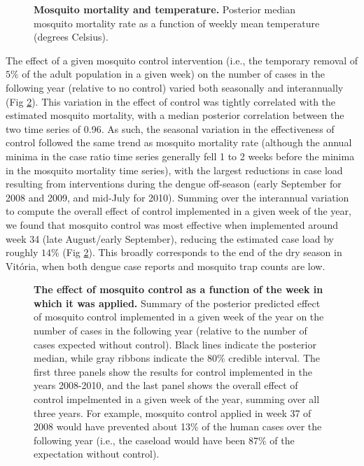\documentclass[10pt,letterpaper]{article}
\begin{document}
\begin{figure}[!h]
\caption{{\bf Mosquito mortality and temperature.}
Posterior median mosquito mortality rate as a function of weekly mean temperature (degrees Celsius).
}
\label{mortality}
\end{figure}

The effect of a given mosquito control intervention (i.e., the temporary removal of $5\%$ of the adult population in a given week) on the number of cases in the following year (relative to no control) varied both seasonally and interannually (Fig \ref{control}).
This variation in the effect of control was tightly correlated with the estimated mosquito mortality, with a median posterior correlation between the two time series of 0.96.
As such, the seasonal variation in the effectiveness of control followed the same trend as mosquito mortality rate (although the annual minima in the case ratio time series generally fell 1 to 2 weeks before the minima in the mosquito mortality time series), with the largest reductions in case load resulting from interventions during the dengue off-season (early September for 2008 and 2009, and mid-July for 2010).
Summing over the interannual variation to compute the overall effect of control implemented in a given week of the year, we found that mosquito control was most effective when implemented around  week 34 (late August/early September), reducing the estimated case load by roughly $14\%$ (Fig \ref{control}).
This broadly corresponds to the end of the dry season in Vit\'oria, when both dengue case reports and mosquito trap counts are low.

\begin{figure}[!h]
\caption{{\bf The effect of mosquito control as a function of the week in which it was applied.}
Summary of the posterior predicted effect of mosquito control implemented in a given week of the year on the number of cases in the following year (relative to the number of cases expected without control).
Black lines indicate the posterior median, while gray ribbons indicate the $80\%$ credible interval.
The first three panels show the results for control implemented in the years 2008-2010, and the last panel shows the overall effect of control impelmented in a given week of the year, summing over all three years.
For example, mosquito control applied in week 37 of 2008 would have prevented about 13\% of the human cases over the following year (i.e., the caseload would have been 87\% of the expectation without control).
}
\label{control}
\end{figure}
\end{document}

